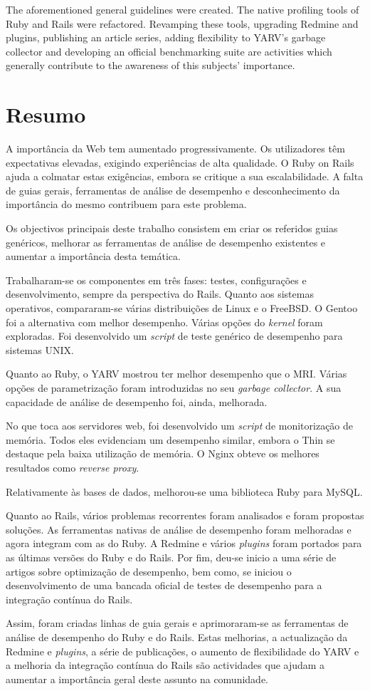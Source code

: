The aforementioned general guidelines were created. The native profiling tools of Ruby and Rails were refactored. Revamping these tools, upgrading Redmine and plugins, publishing an article series, adding flexibility to YARV's garbage collector and developing an official benchmarking suite are activities which generally contribute to the awareness of this subjects' importance.


\chapter*{Resumo}
A importância da Web tem aumentado progressivamente. Os utilizadores têm expectativas elevadas, exigindo experiências de alta qualidade. O Ruby on Rails ajuda a colmatar estas exigências, embora se critique a sua escalabilidade. A falta de guias gerais, ferramentas de análise de desempenho e desconhecimento da importância do mesmo contribuem para este problema.

Os objectivos principais deste trabalho consistem em criar os referidos guias genéricos, melhorar as ferramentas de análise de desempenho existentes e aumentar a importância desta temática.

Trabalharam-se os componentes em três fases: testes, configurações e desenvolvimento, sempre da perspectiva do Rails. Quanto aos sistemas operativos, compararam-se várias distribuições de Linux e o FreeBSD. O Gentoo foi a alternativa com melhor desempenho. Várias opções do \textit{kernel} foram exploradas. Foi desenvolvido um \textit{script} de teste genérico de desempenho para sistemas UNIX.

Quanto ao Ruby, o YARV mostrou ter melhor desempenho que o MRI. Várias opções de parametrização foram introduzidas no seu \textit{garbage collector}. A sua capacidade de análise de desempenho foi, ainda, melhorada.

No que toca aos servidores web, foi desenvolvido um \textit{script} de monitorização de memória. Todos eles evidenciam um desempenho similar, embora o Thin se destaque pela baixa utilização de memória. O Nginx obteve os melhores resultados como \textit{reverse proxy}.

Relativamente às bases de dados, melhorou-se uma biblioteca Ruby para MySQL.

Quanto ao Rails, vários problemas recorrentes foram analisados e foram propostas soluções. As ferramentas nativas de análise de desempenho foram melhoradas e agora integram com as do Ruby. A Redmine e vários \textit{plugins} foram portados para as últimas versões do Ruby e do Rails. Por fim, deu-se inicio a uma série de artigos sobre optimização de desempenho, bem como, se iniciou o desenvolvimento de uma bancada oficial de testes de desempenho para a integração contínua do Rails.

Assim, foram criadas linhas de guia gerais e aprimoraram-se as ferramentas de análise de desempenho do Ruby e do Rails. Estas melhorias, a actualização da Redmine e \textit{plugins}, a série de publicações, o aumento de flexibilidade do YARV e a melhoria da integração contínua do Rails são actividades que ajudam a aumentar a importância geral deste assunto na comunidade.
 
